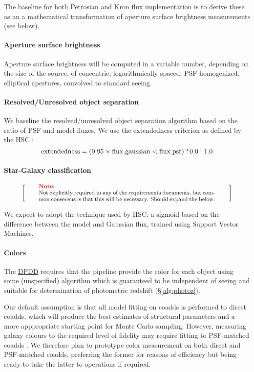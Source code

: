 \documentclass[12pt]{article}
\newcommand{\ds}[2]{{\color{blue} \href{https://docushare.lsstcorp.org/docushare/dsweb/Get/#1}{#2}}\xspace}
\newcommand{\DPDD}{\ds{LSE-163}{DPDD}}
\newenvironment{note}[1][Note]
{
  \begin{displaymath}
    \left[ \qquad
    \begin{minipage}[h]{.75\linewidth}
      \color{red} \footnotesize
      \textbf{#1:} \newline
      \color{black}
}
{
    \end{minipage}
    \normalsize
    \qquad \right]
  \end{displaymath}
}
\begin{document}
The baseline for both Petrosian and Kron flux implementation is to derive these as an a mathematical transformation of aperture surface brightness measurements (see below).

\paragraph{Aperture surface brightness} Aperture surface brightness will be computed in a variable number, depending on the size of the source, of concentric, logarithmically spaced, PSF-homogenized, elliptical apertures, convolved to standard seeing.

\paragraph{Resolved/Unresolved object separation}
\label{alg:star-galaxy}

We baseline the resolved/unresolved object separation algorithm based on the ratio of PSF and model fluxes. We use the extendedness criterion as defined by the HSC \cite{Furusawa14}:
\begin{equation}
{\rm extendedness} = (0.95\times {\rm flux.gaussian} < {\rm flux.psf})\, ?\, 0.0 : 1.0 \nonumber
\end{equation}

\paragraph{Star-Galaxy classification}

\begin{note}
Not explicitly required in any of the requirements documents, but common consensus is that this will be necessary. Should expand the below.
\end{note}

We expect to adopt the technique used by HSC\@: a sigmoid based on the difference between the model and Gaussian flux, trained using Support Vector Machines.

\paragraph{Colors}

The \DPDD{} requires that the pipeline provide the color for each object using some (unspecified) algorithm which is guaranteed to be independent of seeing and suitable for determination of photometric redshift (\S\ref{alg:photoz}).

Our default assumption is that all model fitting on coadds is performed to direct coadds, which will produce the best estimates of structural parameters and a more apppropriate starting point for Monte Carlo sampling. However, measuring galaxy colours to the required level of fidelity may require fitting to PSF-matched coadds \cite[\S8.2.2]{Bosch15}. We therefore plan to prototype color measurement on both direct and PSF-matched coadds, preferring the former for reasons of efficiency but being ready to take the latter to operations if required.
\end{document}
